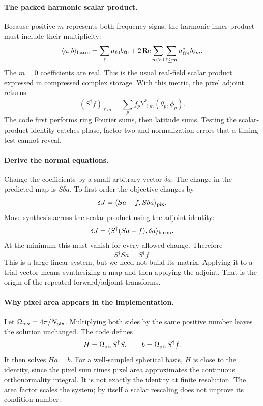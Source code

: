 \documentclass[11pt]{article}
\begin{document}
\paragraph{The packed harmonic scalar product.}
Because positive $m$ represents both frequency signs, the harmonic inner
product must include their multiplicity:
\begin{equation}
 \langle a,b\rangle_{\rm harm}
 =\sum_{\ell}a_{\ell0}b_{\ell0}
 +2\operatorname{Re}\sum_{m>0}\sum_{\ell\ge m}a_{\ell m}^{*}b_{\ell m}.
\end{equation}
The $m=0$ coefficients are real. This is the usual real-field scalar
product expressed in compressed complex storage. With this metric, the
pixel adjoint returns
\begin{equation}
 (S^\dagger f)_{\ell m}=\sum_p f_p Y_{\ell m}^{*}(\theta_p,\phi_p).
\end{equation}
The code first performs ring Fourier sums, then latitude sums. Testing the
scalar-product identity catches phase, factor-two and normalization errors
that a timing test cannot reveal.

\paragraph{Derive the normal equations.}
Change the coefficients by a small arbitrary vector $\delta a$. The change
in the predicted map is $S\delta a$. To first order the objective changes by
\begin{equation}
 \delta J=\langle Sa-f,S\delta a\rangle_{\rm pix}.
\end{equation}
Move synthesis across the scalar product using the adjoint identity:
\begin{equation}
 \delta J=\langle S^\dagger(Sa-f),\delta a\rangle_{\rm harm}.
\end{equation}
At the minimum this must vanish for every allowed change. Therefore
\begin{equation}
 S^\dagger S a=S^\dagger f.
\end{equation}
This is a large linear system, but we need not build its matrix. Applying
it to a trial vector means synthesizing a map and then applying the
adjoint. That is the origin of the repeated forward/adjoint transforms.

\paragraph{Why pixel area appears in the implementation.}
Let $\Omega_{\rm pix}=4\pi/N_{\rm pix}$. Multiplying both sides by the same
positive number leaves the solution unchanged. The code defines
\begin{equation}
 H=\Omega_{\rm pix}S^\dagger S,\qquad
 b=\Omega_{\rm pix}S^\dagger f.
\end{equation}
It then solves $Ha=b$. For a well-sampled spherical basis, $H$ is close to
the identity, since the pixel sum times pixel area approximates the
continuous orthonormality integral. It is not exactly the identity at
finite resolution. The area factor scales the system; by itself a scalar
rescaling does not improve its condition number.
\end{document}

